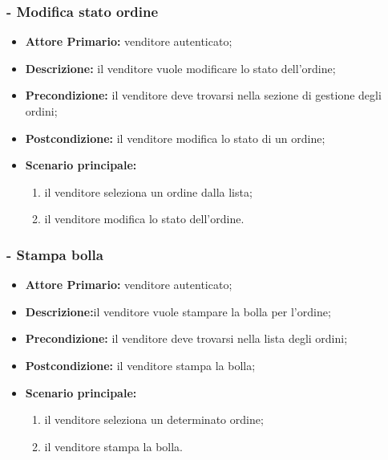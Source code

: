 \stepsubUserCase
\subsubsection{- Modifica stato ordine}
\begin{itemize}
    \item \textbf{Attore Primario:} venditore autenticato;
    \item \textbf{Descrizione:} il venditore vuole modificare lo stato dell'ordine;
    \item \textbf{Precondizione:} il venditore deve trovarsi nella sezione di gestione degli ordini;
    \item \textbf{Postcondizione:} il venditore modifica lo stato di un ordine;
    \item \textbf{Scenario principale:}
    \begin{enumerate}
        \item il venditore seleziona un ordine dalla lista;
        \item il venditore modifica lo stato dell'ordine.
    \end{enumerate}
\end{itemize}

\stepsubUserCase
\subsubsection{- Stampa bolla}
\begin{itemize}
    \item \textbf{Attore Primario:} venditore autenticato;
    \item \textbf{Descrizione:}il venditore vuole stampare la bolla per l'ordine;
    \item \textbf{Precondizione:} il venditore deve trovarsi nella lista degli ordini;
    \item \textbf{Postcondizione:} il venditore stampa la bolla;
    \item \textbf{Scenario principale:}
    \begin{enumerate}
        \item il venditore seleziona un determinato ordine;
        \item il venditore stampa la bolla.
    \end{enumerate}
\end{itemize}

\stepsubUserCase
